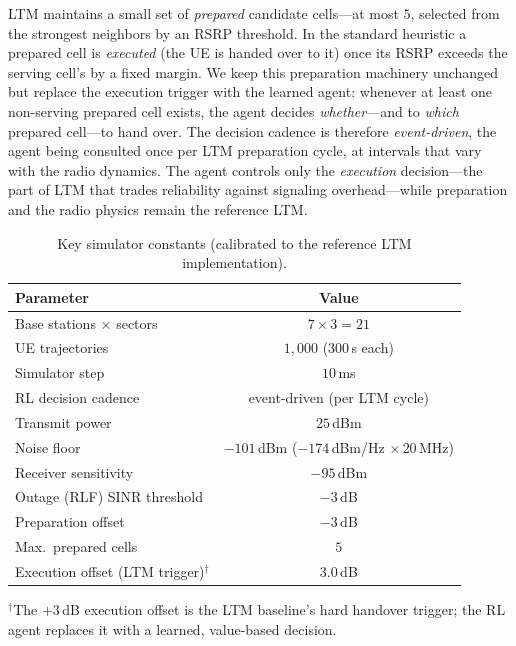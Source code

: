 \documentclass[conference]{IEEEtran}
\begin{document}
LTM maintains a small set of \emph{prepared} candidate cells---at most $5$,
selected from the strongest neighbors by an RSRP threshold. In
the standard heuristic a prepared cell is \emph{executed} (the UE is handed over
to it) once its RSRP exceeds the serving cell's by a fixed margin. We keep this
preparation machinery unchanged but replace the execution trigger with the
learned agent: whenever at least one non-serving prepared cell exists, the agent
decides \emph{whether}---and to \emph{which} prepared cell---to hand over. The
decision cadence is therefore \emph{event-driven}, the agent being consulted
once per LTM preparation cycle, at intervals that vary with the radio dynamics.
The agent controls only the \emph{execution} decision---the part of LTM
that trades reliability against signaling overhead---while preparation and the
radio physics remain the reference LTM.

\begin{table}[htbp]
\caption{Key simulator constants (calibrated to the reference LTM implementation).}
\label{tab:sysparams}
\centering
 \begin{tabular}{|l|c|}
\hline
\textbf{Parameter} & \textbf{Value} \\
\hline
Base stations $\times$ sectors      & $7 \times 3 = 21$ \\
UE trajectories                     & $1{,}000$ ($300$\,s each) \\
Simulator step                      & $10$\,ms \\
RL decision cadence                 & event-driven (per LTM cycle) \\
Transmit power                      & $25$\,dBm \\
Noise floor                         & $-101$\,dBm ($-174$\,dBm/Hz $\times\,20$\,MHz) \\
Receiver sensitivity                & $-95$\,dBm \\
Outage (RLF) SINR threshold         & $-3$\,dB \\
Preparation offset                  & $-3$\,dB \\
Max.\ prepared cells                & $5$ \\
Execution offset (LTM trigger)$^{\dagger}$ & $3.0$\,dB \\
\hline
\end{tabular}
{\footnotesize $^{\dagger}$The $+3$\,dB execution offset is the LTM baseline's
hard handover trigger; the RL agent replaces it with a learned, value-based
decision.}
\end{table}
\end{document}
